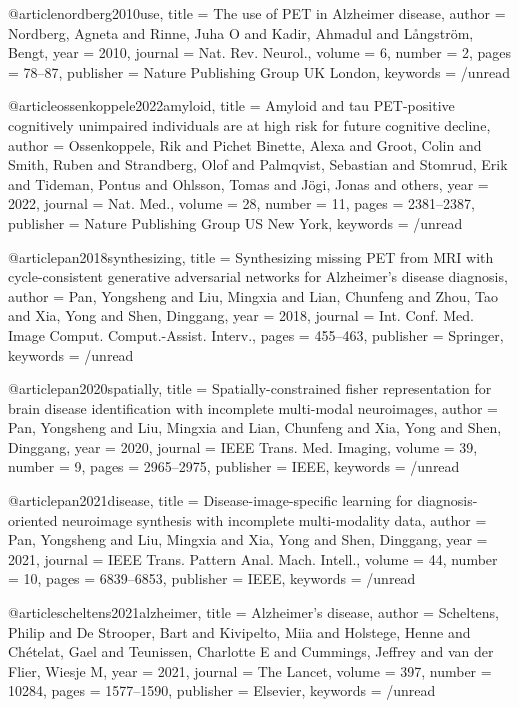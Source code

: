 @article{nordberg2010use,
  title = {The use of {{PET}} in {{Alzheimer}} disease},
  author = {Nordberg, Agneta and Rinne, Juha O and Kadir, Ahmadul and L{\aa}ngstr{\"o}m, Bengt},
  year = 2010,
  journal = {Nat. Rev. Neurol.},
  volume = {6},
  number = {2},
  pages = {78--87},
  publisher = {Nature Publishing Group UK London},
  keywords = {/unread}
}

@article{ossenkoppele2022amyloid,
  title = {Amyloid and tau {{PET-positive}} cognitively unimpaired individuals are at high risk for future cognitive decline},
  author = {Ossenkoppele, Rik and Pichet Binette, Alexa and Groot, Colin and Smith, Ruben and Strandberg, Olof and Palmqvist, Sebastian and Stomrud, Erik and Tideman, Pontus and Ohlsson, Tomas and J{\"o}gi, Jonas and others},
  year = 2022,
  journal = {Nat. Med.},
  volume = {28},
  number = {11},
  pages = {2381--2387},
  publisher = {Nature Publishing Group US New York},
  keywords = {/unread}
}

@article{pan2018synthesizing,
  title = {Synthesizing missing {{PET}} from {{MRI}} with cycle-consistent generative adversarial networks for {{Alzheimer}}'s disease diagnosis},
  author = {Pan, Yongsheng and Liu, Mingxia and Lian, Chunfeng and Zhou, Tao and Xia, Yong and Shen, Dinggang},
  year = 2018,
  journal = {Int. Conf. Med. Image Comput. Comput.-Assist. Interv.},
  pages = {455--463},
  publisher = {Springer},
  keywords = {/unread}
}

@article{pan2020spatially,
  title = {Spatially-constrained fisher representation for brain disease identification with incomplete multi-modal neuroimages},
  author = {Pan, Yongsheng and Liu, Mingxia and Lian, Chunfeng and Xia, Yong and Shen, Dinggang},
  year = 2020,
  journal = {IEEE Trans. Med. Imaging},
  volume = {39},
  number = {9},
  pages = {2965--2975},
  publisher = {IEEE},
  keywords = {/unread}
}

@article{pan2021disease,
  title = {Disease-image-specific learning for diagnosis-oriented neuroimage synthesis with incomplete multi-modality data},
  author = {Pan, Yongsheng and Liu, Mingxia and Xia, Yong and Shen, Dinggang},
  year = 2021,
  journal = {IEEE Trans. Pattern Anal. Mach. Intell.},
  volume = {44},
  number = {10},
  pages = {6839--6853},
  publisher = {IEEE},
  keywords = {/unread}
}

@article{scheltens2021alzheimer,
  title = {Alzheimer's disease},
  author = {Scheltens, Philip and De Strooper, Bart and Kivipelto, Miia and Holstege, Henne and Ch{\'e}telat, Gael and Teunissen, Charlotte E and Cummings, Jeffrey and {van der Flier}, Wiesje M},
  year = 2021,
  journal = {The Lancet},
  volume = {397},
  number = {10284},
  pages = {1577--1590},
  publisher = {Elsevier},
  keywords = {/unread}
}

